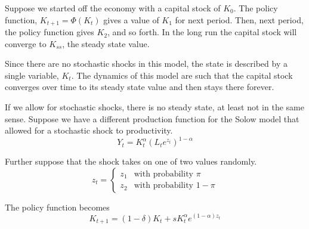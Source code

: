 \documentclass[letterpaper,12pt]{article}
\theoremstyle{definition}
\begin{document}
\begin{spacing}{1.5}
			Suppose we started off the economy with a capital stock of $K_0$. The policy function, $K_{t+1}=\Phi(K_t)$ gives a value of $K_1$ for next period. Then, next period, the policy function gives $K_2$, and so forth. In the long run the capital stock will converge to $K_{ss}$, the steady state value.

			Since there are no stochastic shocks in this model, the state is described by a single variable, $K_t$. The dynamics of this model are such that the capital stock converges over time to its steady state value and then stays there forever.

			If we allow for stochastic shocks, there is no steady state, at least not in the same sense. Suppose we have a different production function for the Solow model that allowed for a stochastic shock to productivity.
			\begin{equation}
			Y_t = K_t^\alpha (L_te^{z_t})^{1-\alpha} \nonumber
			\end{equation}

			Further suppose that the shock takes on one of two values randomly.
			\begin{equation}
			z_t = \left\{\begin{matrix} z_1 & \text{with probability  } \pi \\ z_2 & \text{with probability  } 1-\pi \end{matrix} \right. \nonumber
			\end{equation}

			The policy function becomes
			\begin{equation}
			 K_{t+1} = (1-\delta)K_t  + s K_t^\alpha e^{(1-\alpha)z_t}
			\end{equation}


\end{spacing}
\end{document}

